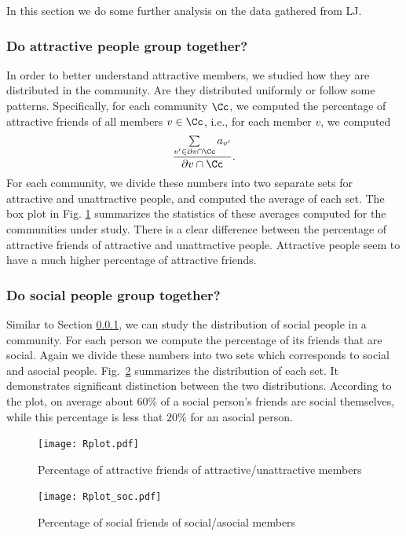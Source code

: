 In this section we do some further analysis on the data gathered from LJ. 

\subsubsection{Do attractive people group together?}\label{sec:att_dist}

In order to better understand attractive members, we studied how they are distributed in the community. Are they distributed uniformly or follow some patterns.  Specifically,  for each community $\Cc$, we computed the percentage of attractive friends of all members $v\in\Cc$, i.e., for each member $v$, we computed
\[
\frac{\sum\limits_{v'\in\partial v \cap \Cc } a_{v'}}{\partial v \cap \Cc }.
\]  
For each community, we divide these numbers into two separate sets for attractive and unattractive people, and computed the average of each set. The box plot in Fig. \ref{fig: perc att} summarizes the statistics of these averages computed for the communities under study. There is a clear difference between the percentage of attractive friends of attractive and unattractive people. Attractive people seem to have a much higher percentage of attractive friends. 


\subsubsection{Do social people group together?}

Similar to Section \ref{sec:att_dist}, we can study the distribution of social people in a community. For each person we compute the percentage of its friends that are social. Again we divide these numbers into two sets which corresponds to social and asocial people. Fig.~\ref{fig: perc social} summarizes the distribution of each set. It demonstrates significant distinction between the two distributions.  According to the plot, on average about $60\%$ of a social person's friends are social themselves, while this percentage is less that $20\%$ for an asocial person.

\begin{figure}
\begin{center}
\texttt{[image: Rplot.pdf]}\caption{Percentage of attractive friends of attractive/unattractive members}\label{fig: perc att}
\end{center}
\end{figure}

\begin{figure}
\begin{center}
\texttt{[image: Rplot\_soc.pdf]}\caption{Percentage of social friends of social/asocial members}\label{fig: perc social}
\end{center}
\end{figure}


